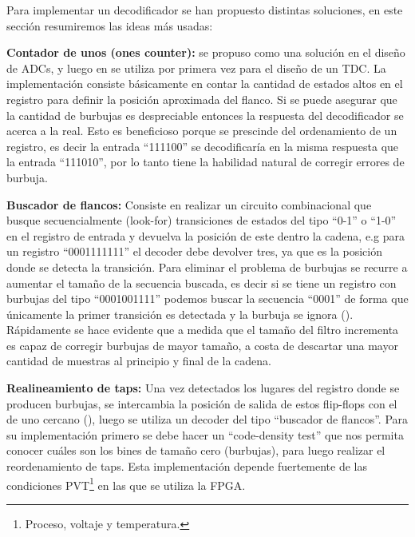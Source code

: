 Para implementar un decodificador se han propuesto distintas soluciones, en este sección resumiremos las ideas más usadas:
\begin{bangenumerate}
     \item \textbf{Contador de unos (ones counter):} se propuso como una solución en el diseño de ADCs, y luego en \cite{wang_39-ps_2017} se utiliza por primera vez
     para el diseño de un TDC. La implementación consiste básicamente en contar la cantidad de estados altos en el registro para definir la posición aproximada del flanco. 
     Si se puede asegurar que la cantidad de burbujas es despreciable entonces la respuesta del decodificador se acerca a la real. Esto es beneficioso porque 
     se prescinde del ordenamiento de un registro, es decir la entrada ``111100'' se decodificaría en la misma respuesta que la entrada ``111010'', por lo tanto
     tiene la habilidad natural de corregir errores de burbuja.

     \item \textbf{Buscador de flancos:} Consiste en realizar un circuito combinacional que busque secuencialmente (look-for) transiciones de estados del tipo ``0-1'' o ``1-0'' en el
     registro de entrada y devuelva la posición de este dentro la cadena, e.g para un registro ``0001111111'' el decoder debe devolver tres, ya que es la
     posición donde se detecta la transición. Para eliminar el problema de burbujas se recurre a aumentar el tamaño de la secuencia buscada,
     es decir si se tiene un registro con burbujas del tipo ``0001001111'' podemos buscar la secuencia ``0001'' de forma que únicamente la primer transición es detectada
     y la burbuja se ignora (\cite{Wu2010}). Rápidamente se hace evidente que a medida que el tamaño del filtro incrementa es capaz de corregir burbujas
     de mayor tamaño, a costa de descartar una mayor cantidad de muestras al principio y final de la cadena.
     
     
     \item \textbf{Realineamiento de taps:} Una vez detectados los lugares del registro donde se producen burbujas, se intercambia la posición de salida
     de estos flip-flops con el de uno cercano (\cite{Liu2015}), luego se utiliza un decoder del tipo ``buscador de flancos''. Para su implementación primero
     se debe hacer un ``code-density test'' que nos permita conocer cuáles son los bines de tamaño cero (burbujas), para luego realizar el reordenamiento de taps. Esta
     implementación depende fuertemente de las condiciones PVT\footnote{Proceso, voltaje y temperatura.} en las que se utiliza la FPGA.
\end{bangenumerate}

